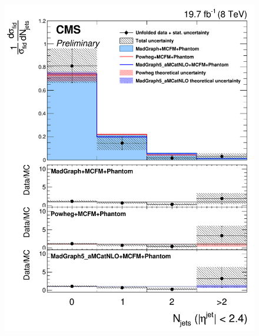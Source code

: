 \begin{figure}[hbtp]
  \begin{center}
    \includegraphics[width=\cmsFigWidth]{Figures/DiffCrossSecZZTo4mCentralJets_Unfolded_fr_MadGraph_norm.png}     

\end{center}
\end{figure}
